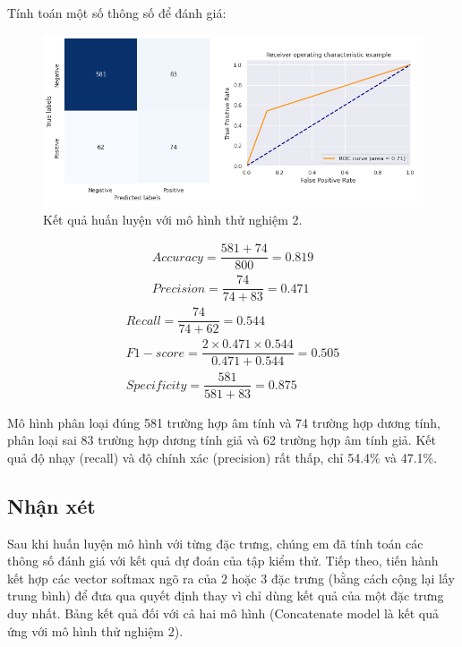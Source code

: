 \documentclass[a4paper, 12pt]{article}
\begin{document}
Tính toán một số thông số để đánh giá:

\begin{figure}[!h]
\captionsetup{width=0.8\textwidth}
\centering
\includegraphics[width=16.5cm]{images/5.4.png}
\caption{Kết quả huấn luyện với mô hình thử nghiệm 2.}
\end{figure}

\begin{align*}
    Accuracy = \dfrac{581+74}{800} = 0.819\\
        Precision = \dfrac{74}{74+83} = 0.471
    \end{align*}
\begin{align*}
    Recall = \dfrac{74}{74+62} = 0.544\\
    F1-score = \dfrac{2\times0.471\times0.544}{0.471+0.544} = 0.505\\
    Specificity = \dfrac{581}{581+83}=0.875
\end{align*}

Mô hình phân loại đúng 581 trường hợp âm tính và 74 trường hợp dương tính, phân loại sai 83 trường hợp dương tính giả và 62 trường hợp âm tính giả. Kết quả độ nhạy (recall) và độ chính xác (precision) rất thấp, chỉ 54.4\% và 47.1\%.

\subsection{Nhận xét}

Sau khi huấn luyện mô hình với từng đặc trưng, chúng em đã tính toán các thông số đánh giá với kết quả dự đoán của tập kiểm thử. Tiếp theo, tiến hành kết hợp các vector softmax ngõ ra của 2 hoặc 3 đặc trưng (bằng cách cộng lại lấy trung bình) để đưa qua quyết định thay vì chỉ dùng kết quả của một đặc trưng duy nhất. Bảng kết quả đối với cả hai mô hình (Concatenate model là kết quả ứng với mô hình thử nghiệm 2).
\end{document}
